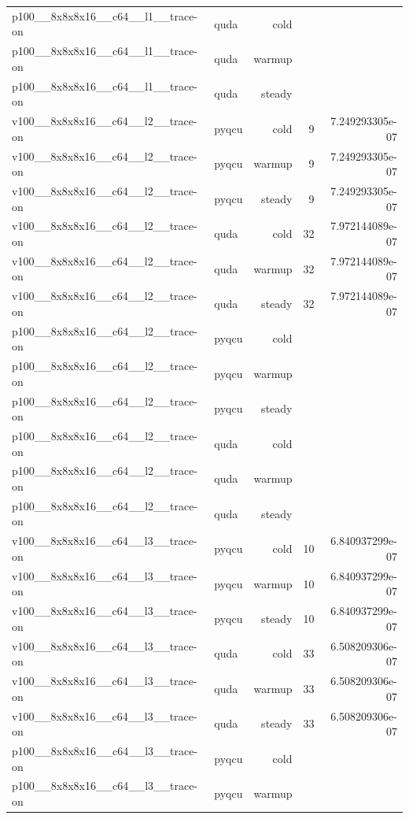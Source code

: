 \begin{table}[htbp]
\begin{tabular}{@{}llrrr@{}}
p100\_\_8x8x8x16\_\_c64\_\_l1\_\_trace-on & quda & cold &  &  \\
p100\_\_8x8x8x16\_\_c64\_\_l1\_\_trace-on & quda & warmup &  &  \\
p100\_\_8x8x8x16\_\_c64\_\_l1\_\_trace-on & quda & steady &  &  \\
v100\_\_8x8x8x16\_\_c64\_\_l2\_\_trace-on & pyqcu & cold & 9 & 7.249293305e-07 \\
v100\_\_8x8x8x16\_\_c64\_\_l2\_\_trace-on & pyqcu & warmup & 9 & 7.249293305e-07 \\
v100\_\_8x8x8x16\_\_c64\_\_l2\_\_trace-on & pyqcu & steady & 9 & 7.249293305e-07 \\
v100\_\_8x8x8x16\_\_c64\_\_l2\_\_trace-on & quda & cold & 32 & 7.972144089e-07 \\
v100\_\_8x8x8x16\_\_c64\_\_l2\_\_trace-on & quda & warmup & 32 & 7.972144089e-07 \\
v100\_\_8x8x8x16\_\_c64\_\_l2\_\_trace-on & quda & steady & 32 & 7.972144089e-07 \\
p100\_\_8x8x8x16\_\_c64\_\_l2\_\_trace-on & pyqcu & cold &  &  \\
p100\_\_8x8x8x16\_\_c64\_\_l2\_\_trace-on & pyqcu & warmup &  &  \\
p100\_\_8x8x8x16\_\_c64\_\_l2\_\_trace-on & pyqcu & steady &  &  \\
p100\_\_8x8x8x16\_\_c64\_\_l2\_\_trace-on & quda & cold &  &  \\
p100\_\_8x8x8x16\_\_c64\_\_l2\_\_trace-on & quda & warmup &  &  \\
p100\_\_8x8x8x16\_\_c64\_\_l2\_\_trace-on & quda & steady &  &  \\
v100\_\_8x8x8x16\_\_c64\_\_l3\_\_trace-on & pyqcu & cold & 10 & 6.840937299e-07 \\
v100\_\_8x8x8x16\_\_c64\_\_l3\_\_trace-on & pyqcu & warmup & 10 & 6.840937299e-07 \\
v100\_\_8x8x8x16\_\_c64\_\_l3\_\_trace-on & pyqcu & steady & 10 & 6.840937299e-07 \\
v100\_\_8x8x8x16\_\_c64\_\_l3\_\_trace-on & quda & cold & 33 & 6.508209306e-07 \\
v100\_\_8x8x8x16\_\_c64\_\_l3\_\_trace-on & quda & warmup & 33 & 6.508209306e-07 \\
v100\_\_8x8x8x16\_\_c64\_\_l3\_\_trace-on & quda & steady & 33 & 6.508209306e-07 \\
p100\_\_8x8x8x16\_\_c64\_\_l3\_\_trace-on & pyqcu & cold &  &  \\
p100\_\_8x8x8x16\_\_c64\_\_l3\_\_trace-on & pyqcu & warmup &  &  \\

\end{tabular}
\end{table}
